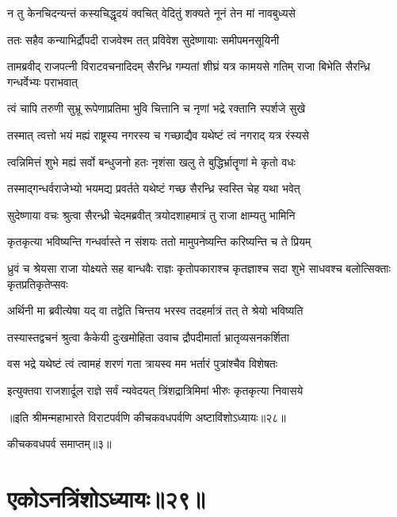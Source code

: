 \twolineshloka
{न तु केनचिदन्यन्तं कस्यचिद्धृदयं क्वचित्}
{वेदितुं शक्यते नूनं तेन मां नावबुध्यसे}



\twolineshloka
{ततः सहैव कन्याभिर्द्रौपदी राजवेश्म तत्}
{प्रविवेश सुदेष्णायाः समीपमनसूयिनी}


\threelineshloka
{तामब्रवीद् राजपत्नी विराटवचनादिदम्}
{सैरन्ध्रि गम्यतां शीघ्रं यत्र कामयसे गतिम्}
{राजा बिभेति सैरन्ध्रि गन्धर्वेभ्यः पराभवात्}


\twolineshloka
{त्वं चापि तरुणी सुभ्रू रूपेणाप्रतिमा भुवि}
{चित्तानि च नृणां भद्रे रक्तानि स्पर्शजे सुखे}


\twolineshloka
{तस्मात् त्वत्तो भयं मह्यं राष्ट्रस्य नगरस्य च}
{गच्छाद्यैव यथेष्टं त्वं नगराद् यत्र रंस्यसे}


\twolineshloka
{त्वन्निमित्तं शुभे मह्यं सर्वो बन्धुजनो हतः}
{नृशंसा खलु ते बुद्धिर्भ्रातॄणां मे कृतो वधः}


\twolineshloka
{तस्माद्गन्धर्वराजेभ्यो भयमद्य प्रवर्तते}
{यथेष्टं गच्छ सैरन्ध्रि स्वस्ति चेह यथा भवेत्}



\twolineshloka
{सुदेष्णाया वचः श्रुत्वा सैरन्ध्री चेदमब्रवीत्}
{त्रयोदशाहमात्रं तु राजा क्षाम्यतु भामिनि}


\twolineshloka
{कृतकृत्या भविष्यन्ति गन्धर्वास्ते न संशयः}
{ततो मामुपनेष्यन्ति करिष्यन्ति च ते प्रियम्}


\threelineshloka
{ध्रुवं च श्रेयसा राजा योक्ष्यते सह बान्धवैः}
{राज्ञः कृतोपकाराश्च कृतज्ञाश्च सदा शुभे}
{साधवश्च बलोत्सिक्ताः कृतप्रतिकृतेप्सवः}


\twolineshloka
{अर्थिनी मा ब्रवीत्येषा यद् वा तद्वेति चिन्तय}
{भरस्व तदहर्मात्रं तत् ते श्रेयो भविष्यति}



\twolineshloka
{तस्यास्तद्वचनं श्रुत्वा कैकेयी दुःखमोहिता}
{उवाच द्रौपदीमार्ता भ्रातृव्यसनकर्शिता}


\twolineshloka
{वस भद्रे यथेष्टं त्वं त्वामहं शरणं गता}
{त्रायस्व मम भर्तारं पुत्रांश्चैव विशेषतः}


\twolineshloka
{इत्युक्तवा राजशार्दूल राज्ञे सर्वं न्यवेदयत्}
{त्रिंशद्रात्रिमिमां भीरुः कृतकृत्या निवासये}

॥इति श्रीमन्महाभारते विराटपर्वणि कीचकवधपर्वणि अष्टाविंशोऽध्यायः॥२८॥ 

कीचकवधपर्व समाप्तम्॥३॥

\chapter{एकोऽनत्रिंशोऽध्यायः॥२९॥}

